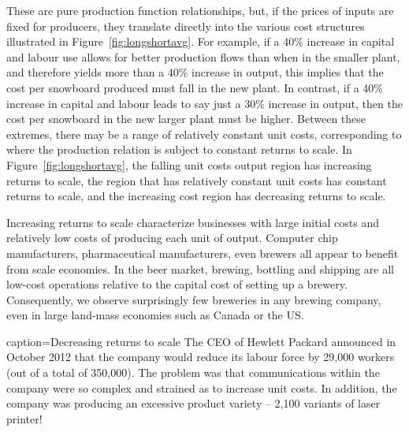 \newhtmlpage

These are pure production function relationships, but, if the prices of
inputs are fixed for producers, they translate directly into the various
cost structures illustrated in Figure~\ref{fig:longshortavg}. For example,
if a 40\% increase in capital and labour use allows for better production
flows than when in the smaller plant, and therefore yields more than a 40\%
increase in output, this implies that the cost per snowboard produced must
fall in the new plant. In contrast, if a 40\% increase in capital and labour
leads to say just a 30\% increase in output, then the cost per snowboard in
the new larger plant must be higher. Between these extremes, there may be a
range of relatively constant unit costs, corresponding to where the
production relation is subject to constant returns to scale. In 
Figure~\ref{fig:longshortavg}, the falling unit costs output region has increasing
returns to scale, the region that has relatively constant unit costs has
constant returns to scale, and the increasing cost region has decreasing
returns to scale.

Increasing returns to scale characterize businesses with large initial costs
and relatively low costs of producing each unit of output. Computer chip
manufacturers, pharmaceutical manufacturers, even brewers all appear to
benefit from scale economies. In the beer market, brewing, bottling and
shipping are all low-cost operations relative to the capital cost of setting
up a brewery. Consequently, we observe surprisingly few breweries in any
brewing company, even in large land-mass economies such as Canada or the US.

\begin{ApplicationBox}{caption={Decreasing returns to scale \label{app:decretscale}}}
	The CEO of Hewlett Packard announced in October 2012 that the company would reduce its labour force by 29,000 workers (out of a total of 350,000). The problem was that communications within the company were so complex and strained as to increase unit costs. In addition, the company was producing an excessive product variety -- 2,100 variants of laser printer!
\end{ApplicationBox}


